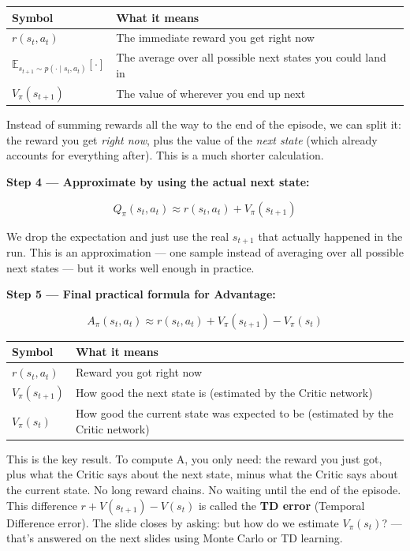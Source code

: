\begin{center}
\begin{tabular}{ll}
\hline
Symbol & What it means \\
\hline
$r(s_t, a_t)$ & The immediate reward you get right now \\
$\mathbb{E}_{s_{t+1} \sim p(\cdot \mid s_t, a_t)}[\cdot]$ & The average over all possible next states you could land in \\
$V_\pi(s_{t+1})$ & The value of wherever you end up next \\
\hline
\end{tabular}
\end{center}

Instead of summing rewards all the way to the end of the episode, we can split it: the reward you get \textit{right now}, plus the value of the \textit{next state} (which already accounts for everything after). This is a much shorter calculation.

\medskip

\textbf{Step 4 --- Approximate by using the actual next state:}

\[
Q_\pi(s_t, a_t) \approx r(s_t, a_t) + V_\pi(s_{t+1})
\]

We drop the expectation and just use the real $s_{t+1}$ that actually happened in the run. This is an approximation --- one sample instead of averaging over all possible next states --- but it works well enough in practice.

\medskip

\textbf{Step 5 --- Final practical formula for Advantage:}

\[
A_\pi(s_t, a_t) \approx r(s_t, a_t) + V_\pi(s_{t+1}) - V_\pi(s_t)
\]

\begin{center}
\begin{tabular}{ll}
\hline
Symbol & What it means \\
\hline
$r(s_t, a_t)$      & Reward you got right now \\
$V_\pi(s_{t+1})$   & How good the next state is (estimated by the Critic network) \\
$V_\pi(s_t)$       & How good the current state was expected to be (estimated by the Critic network) \\
\hline
\end{tabular}
\end{center}

This is the key result. To compute A, you only need: the reward you just got, plus what the Critic says about the next state, minus what the Critic says about the current state. No long reward chains. No waiting until the end of the episode. This difference $r + V(s_{t+1}) - V(s_t)$ is called the \textbf{TD error} (Temporal Difference error). The slide closes by asking: but how do we estimate $V_\pi(s_t)$? --- that's answered on the next slides using Monte Carlo or TD learning.

